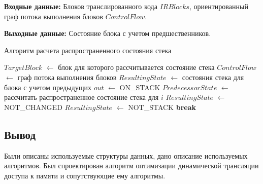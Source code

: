 \textbf{Входные данные:} Блоков транслированного кода $IRBlocks$, ориентированный граф потока выполнения блоков $ControlFlow$.

\textbf{Выходные данные:} Состояние блока с учетом предшественников.

\begin{algorithm}[H]
\small
	\caption{Алгоритм расчета распространенного состояния стека}
	\label{alg:bilin}
	\begin{algorithmic}[1]
		\State $TargetBlock$ $\gets$ блок для которого рассчитывается состояние стека
		\State $ControlFlow$ $\gets$ граф потока выполнения блоков
		\State $ResultingState$ $\gets$ состояния стека для блока с учетом предыдущих
		\State $out$ $\gets$ ON\_STACK
		\State $PredecessorState$ $\gets$ рассчитать распространенное состояние стека для $i$
		\State $ResultingState$ $\gets$ NOT\_CHANGED
		\EndIf
		\State $ResultingState$ $\gets$ NOT\_STACK
		\State \textbf{break}
		\EndIf
		\EndFor
	\end{algorithmic}
\end{algorithm}

\subsection{Вывод}

Были описаны используемые структуры данных, дано описание используемых алгоритмов. Был спроектирован алгоритм оптимизации динамической трансляции доступа к памяти и сопутствующие ему алгоритмы.

\pagebreak